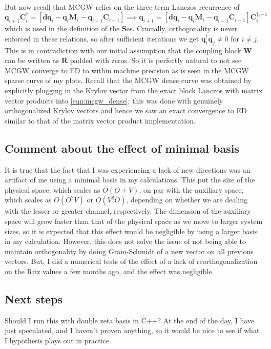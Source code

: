 But now recall that MCGW relies on the three-term Lanczos recurrence of
\begin{equation}
    \mathbf{q}_{i+1} \mathbf{C}_i^{\dagger}=\left[\mathbf{d} \mathbf{q}_i-\mathbf{q}_i \mathbf{M}_i-\mathbf{q}_{i-1} \mathbf{C}_{i-1}\right] \implies \mathbf{q}_{i+1} = \left[\mathbf{d} \mathbf{q}_i-\mathbf{q}_i \mathbf{M}_i-\mathbf{q}_{i-1} \mathbf{C}_{i-1}\right] \bm{C}_i^{\dag, -1}
\label{eqn:lanczos_recurrence}
\end{equation}
which is used in the definition of the $\bm{S}$es.  Crucially, orthogonality is never enforced in these relations, so after sufficient iterations we get $\bm{q}_i^{\dag}\bm{q}_j \neq 0$ for $i\neq j$. This is in contradiction with our initial assumption that the coupling block $\bm{W}$ can be written as $\bm{R}$ padded with zeros. So it is perfectly natural to not see MCGW converge to ED to within machine precision as is seen in the MCGW sparse curve of my plots. Recall that the MCGW dense curve was obtained by explicitly plugging in the Krylov vector from the exact block Lanczos with matrix vector products into \ref{eqn:mcgw_dense}; this was done with genuinely orthogonalized Krylov vectors and hence we saw an exact convergence to ED similar to that of the matrix vector product implementation.
\subsection{Comment about the effect of minimal basis}
It is true that the fact that I was experiencing a lack of new directions was an artifact of me using a minimal basis in my calculations. This put the size of the physical space, which scales as $O(O+V)$, on par with the auxiliary space, which scales as $O(O^2 V)$ or $O(V^2O)$, depending on whether we are dealing with the lesser or greater channel, respectively. The dimension of the auxiliary space will grow faster than that of the physical space as we move to larger system sizes, so it is expected that this effect would be negligible by using a larger basis in my calculation. However, this does not solve the issue of not being able to maintain orthogonality by doing Gram-Schmidt of a new vector on all previous vectors. But, I did a numerical tests of the effect of a lack of reorthogonalization on the Ritz values a few months ago, and the effect was negligible.
\subsection{Next steps}
Should I run this with double zeta basis in C++? At the end of the day, I have just speculated, and I haven't proven anything, so it would be nice to see if what I hypothesis plays out in practice.

